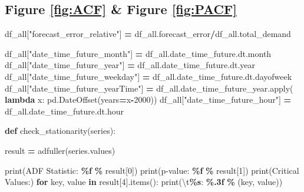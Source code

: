 \documentclass[mstat,12pt]{unswthesis}
\newenvironment{Shaded}{\begin{snugshade}}{\end{snugshade}}
\newcommand{\BuiltInTok}[1]{#1}
\newcommand{\CharTok}[1]{\textcolor[rgb]{0.31,0.60,0.02}{#1}}
\newcommand{\ControlFlowTok}[1]{\textcolor[rgb]{0.13,0.29,0.53}{\textbf{#1}}}
\newcommand{\DecValTok}[1]{\textcolor[rgb]{0.00,0.00,0.81}{#1}}
\newcommand{\KeywordTok}[1]{\textcolor[rgb]{0.13,0.29,0.53}{\textbf{#1}}}
\newcommand{\NormalTok}[1]{#1}
\newcommand{\OperatorTok}[1]{\textcolor[rgb]{0.81,0.36,0.00}{\textbf{#1}}}
\newcommand{\SpecialCharTok}[1]{\textcolor[rgb]{0.81,0.36,0.00}{\textbf{#1}}}
\newcommand{\StringTok}[1]{\textcolor[rgb]{0.31,0.60,0.02}{#1}}
\begin{document}
\subsection*{Figure \ref{fig:ACF} \& Figure \ref{fig:PACF}}\label{figure-reffigacf-figure-reffigpacf}

\begin{Shaded}
\begin{Highlighting}[]
\NormalTok{df\_all[}\StringTok{"forecast\_error\_relative"}\NormalTok{] }\OperatorTok{=} 
\NormalTok{    df\_all.forecast\_error}\OperatorTok{/}\NormalTok{df\_all.total\_demand}

\NormalTok{df\_all[}\StringTok{"date\_time\_future\_month"}\NormalTok{] }\OperatorTok{=}\NormalTok{ df\_all.date\_time\_future.dt.month}
\NormalTok{df\_all[}\StringTok{"date\_time\_future\_year"}\NormalTok{] }\OperatorTok{=}\NormalTok{ df\_all.date\_time\_future.dt.year}
\NormalTok{df\_all[}\StringTok{"date\_time\_future\_weekday"}\NormalTok{] }\OperatorTok{=}\NormalTok{ df\_all.date\_time\_future.dt.dayofweek}
\NormalTok{df\_all[}\StringTok{"date\_time\_future\_yearTime"}\NormalTok{] }\OperatorTok{=} 
\NormalTok{  df\_all.date\_time\_future\_year.}\BuiltInTok{apply}\NormalTok{(}
    \KeywordTok{lambda}\NormalTok{ x: pd.DateOffset(years}\OperatorTok{=}\NormalTok{x}\OperatorTok{{-}}\DecValTok{2000}\NormalTok{))}
\NormalTok{df\_all[}\StringTok{"date\_time\_future\_hour"}\NormalTok{] }\OperatorTok{=}\NormalTok{ df\_all.date\_time\_future.dt.hour}

\KeywordTok{def}\NormalTok{ check\_stationarity(series):}

\NormalTok{    result }\OperatorTok{=}\NormalTok{ adfuller(series.values)}

    \BuiltInTok{print}\NormalTok{(}\StringTok{\textquotesingle{}ADF Statistic: }\SpecialCharTok{\%f}\StringTok{\textquotesingle{}} \OperatorTok{\%}\NormalTok{ result[}\DecValTok{0}\NormalTok{])}
    \BuiltInTok{print}\NormalTok{(}\StringTok{\textquotesingle{}p{-}value: }\SpecialCharTok{\%f}\StringTok{\textquotesingle{}} \OperatorTok{\%}\NormalTok{ result[}\DecValTok{1}\NormalTok{])}
    \BuiltInTok{print}\NormalTok{(}\StringTok{\textquotesingle{}Critical Values:\textquotesingle{}}\NormalTok{)}
    \ControlFlowTok{for}\NormalTok{ key, value }\KeywordTok{in}\NormalTok{ result[}\DecValTok{4}\NormalTok{].items():}
        \BuiltInTok{print}\NormalTok{(}\StringTok{\textquotesingle{}}\CharTok{\textbackslash{}t}\SpecialCharTok{\%s}\StringTok{: }\SpecialCharTok{\%.3f}\StringTok{\textquotesingle{}} \OperatorTok{\%}\NormalTok{ (key, value))}


\end{Highlighting}
\end{Shaded}
\end{document}
